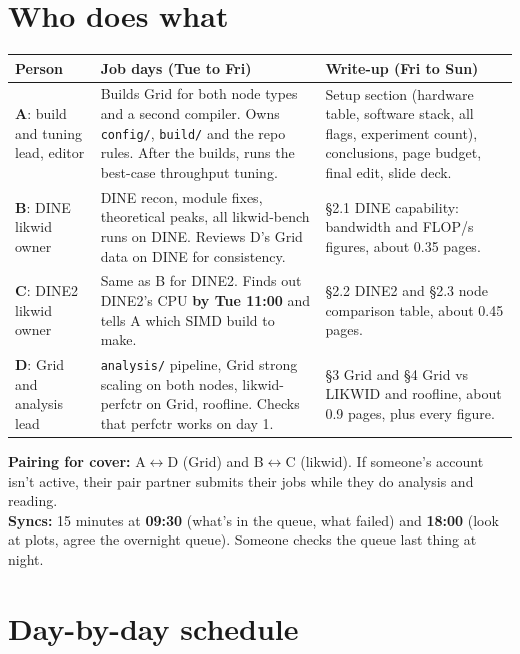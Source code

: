 \documentclass[10pt,a4paper]{article}
\newcommand{\who}[1]{\textbf{\color{accent}#1}}
\begin{document}
\section{Who does what}
\begin{tabularx}{\linewidth}{@{}l L L@{}}
\toprule
\textbf{Person} & \textbf{Job days (Tue to Fri)} & \textbf{Write-up (Fri to Sun)}\\
\midrule
\who{A}: build and tuning lead, editor &
Builds Grid for both node types and a second compiler. Owns \texttt{config/}, \texttt{build/} and the repo rules. After the builds, runs the best-case throughput tuning. &
Setup section (hardware table, software stack, all flags, experiment count), conclusions, page budget, final edit, slide deck.\\
\who{B}: DINE likwid owner &
DINE recon, module fixes, theoretical peaks, all likwid-bench runs on DINE. Reviews D's Grid data on DINE for consistency. &
\S2.1 DINE capability: bandwidth and FLOP/s figures, about 0.35 pages.\\
\who{C}: DINE2 likwid owner &
Same as B for DINE2. Finds out DINE2's CPU \textbf{by Tue 11:00} and tells A which SIMD build to make. &
\S2.2 DINE2 and \S2.3 node comparison table, about 0.45 pages.\\
\who{D}: Grid and analysis lead &
\texttt{analysis/} pipeline, Grid strong scaling on both nodes, likwid-perfctr on Grid, roofline. Checks that perfctr works on day 1. &
\S3 Grid and \S4 Grid vs LIKWID and roofline, about 0.9 pages, plus every figure.\\
\bottomrule
\end{tabularx}

\textbf{Pairing for cover:} A$\leftrightarrow$D (Grid) and B$\leftrightarrow$C (likwid). If someone's account isn't active, their pair partner submits their jobs while they do analysis and reading.\\
\textbf{Syncs:} 15 minutes at \textbf{09:30} (what's in the queue, what failed) and \textbf{18:00} (look at plots, agree the overnight queue). Someone checks the queue last thing at night.

\section{Day-by-day schedule}
\end{document}
